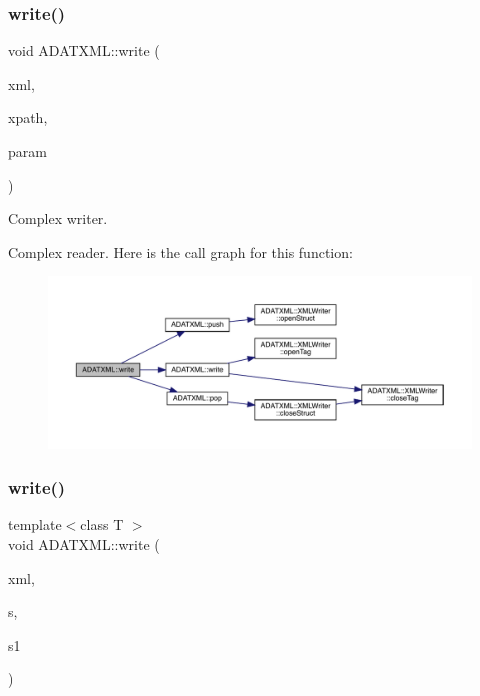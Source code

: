 \subsubsection{\texorpdfstring{write()}{write()}\hspace{0.1cm}{\footnotesize\ttfamily [17/58]}}
{\footnotesize\ttfamily void A\+D\+A\+T\+X\+M\+L\+::write (\begin{DoxyParamCaption}\item[{\mbox{\hyperlink{classADATXML_1_1XMLWriter}{X\+M\+L\+Writer}} \&}]{xml,  }\item[{const std\+::string \&}]{xpath,  }\item[{const std\+::complex$<$ float $>$ \&}]{param }\end{DoxyParamCaption})}



Complex writer. 

Complex reader. Here is the call graph for this function\+:\nopagebreak
\begin{figure}[H]
\begin{center}
\leavevmode
\includegraphics[width=350pt]{d2/da3/group__io_ga120f4c9a4f62f8190c2d87d73124fded_cgraph}
\end{center}
\end{figure}
\mbox{\label{group__io_ga442a3dd5472737a074d3774f46a94f14}} 
\subsubsection{\texorpdfstring{write()}{write()}\hspace{0.1cm}{\footnotesize\ttfamily [18/58]}}
{\footnotesize\ttfamily template$<$class T $>$ \\
void A\+D\+A\+T\+X\+M\+L\+::write (\begin{DoxyParamCaption}\item[{\mbox{\hyperlink{classADATXML_1_1XMLWriter}{X\+M\+L\+Writer}} \&}]{xml,  }\item[{const std\+::string \&}]{s,  }\item[{const std\+::list$<$ T $>$ \&}]{s1 }\end{DoxyParamCaption})\hspace{0.3cm}{\ttfamily [inline]}}




